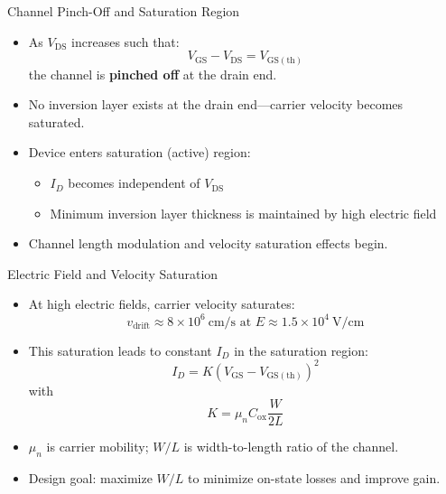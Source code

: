 \begin{frame}{Channel Pinch-Off and Saturation Region}
\begin{itemize}
    \item As $V_{\mathrm{DS}}$ increases such that:
    \[
        V_{\mathrm{GS}} - V_{\mathrm{DS}} = V_{\mathrm{GS(th)}}
    \]
    the channel is \textbf{pinched off} at the drain end.
    \item No inversion layer exists at the drain end—carrier velocity becomes saturated.
    \item Device enters saturation (active) region:
    \begin{itemize}
        \item $I_D$ becomes independent of $V_{\mathrm{DS}}$
        \item Minimum inversion layer thickness is maintained by high electric field
    \end{itemize}
    \item Channel length modulation and velocity saturation effects begin.
\end{itemize}
\end{frame}


\begin{frame}{Electric Field and Velocity Saturation}
\begin{itemize}
    \item At high electric fields, carrier velocity saturates:
    \[
        v_{\mathrm{drift}} \approx 8 \times 10^6~\text{cm/s at } E \approx 1.5 \times 10^4~\text{V/cm}
    \]
    \item This saturation leads to constant $I_D$ in the saturation region:
    \[
        I_D = K (V_{\mathrm{GS}} - V_{\mathrm{GS(th)}})^2
    \]
    with 
    \[
        K = \mu_n C_{\mathrm{ox}} \frac{W}{2L}
    \]
    \item $\mu_n$ is carrier mobility; $W/L$ is width-to-length ratio of the channel.
    \item Design goal: maximize $W/L$ to minimize on-state losses and improve gain.
\end{itemize}
\end{frame}


